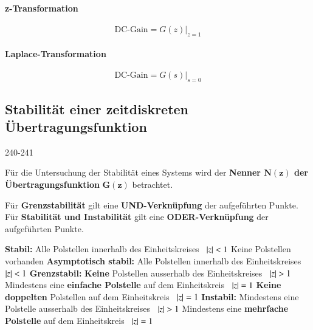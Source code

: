 \smallskip

\begin{minipage}[t]{0.48\columnwidth}
    \paragraph{z-Transformation}

    \vspace{-0.2cm}

    $$ \text{DC-Gain} = G(z) \Big|_{z=1} $$
\end{minipage}
\hfill
\begin{minipage}[t]{0.48\columnwidth}
    \paragraph{Laplace-Transformation}

    \vspace{-0.2cm}

    $$ \text{DC-Gain} = G(s) \Big|_{s=0} $$
\end{minipage}



\subsection{Stabilität einer zeitdiskreten Übertragungsfunktion}{240-241}

Für die Untersuchung der Stabilität eines Systems wird der \textbf{Nenner $\bm{N(z)}$ der Übertragungsfunktion} $\bm{G(z)}$ betrachtet.

\smallskip

Für \textbf{Grenzstabilität} gilt eine \textbf{UND-Verknüpfung} der aufgeführten Punkte. \\
Für \textbf{Stabilität und Instabilität} gilt eine \textbf{ODER-Verknüpfung} der aufgeführten Punkte.

\vspace{0.1cm}

\begin{outline}
    \1 \textbf{Stabil:} 
        \2 Alle Polstellen innerhalb des Einheitskreises \textrightarrow\ $\left|z\right| < 1$
        \2 Keine Polstellen vorhanden 
    \1 \textbf{Asymptotisch stabil:}
        \2 Alle Polstellen innerhalb des Einheitskreises \textrightarrow\ $\left|z\right| < 1$
    \1 \textbf{Grenzstabil:} 
        \2 \textbf{Keine} Polstellen ausserhalb des Einheitskreises \textrightarrow\ $\left|z\right| > 1$
        \2 Mindestens eine \textbf{einfache Polstelle} auf dem Einheitskreis \textrightarrow\ $\left|z\right| = 1$
        \2 \textbf{Keine doppelten} Polstellen auf dem Einheitskreis \textrightarrow\ $\left|z\right| = 1$
    \1 \textbf{Instabil:} 
        \2 Mindestens eine Polstelle ausserhalb des Einheitskreises \textrightarrow\ $\left|z\right| > 1$
        \2 Mindestens eine \textbf{mehrfache Polstelle} auf dem Einheitskreis \textrightarrow\ $\left|z\right| = 1$
\end{outline}

